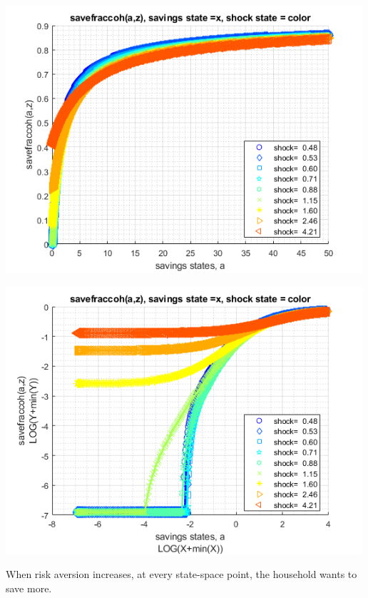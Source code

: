 \documentclass[
]{book}
\begin{document}
\includegraphics[width=5.20833in,height=\textheight]{img/fx_vfi_az_vec_images/figure_2.png}

\includegraphics[width=5.20833in,height=\textheight]{img/fx_vfi_az_vec_images/figure_3.png}

When risk aversion increases, at every state-space point, the household
wants to save more.
\end{document}
